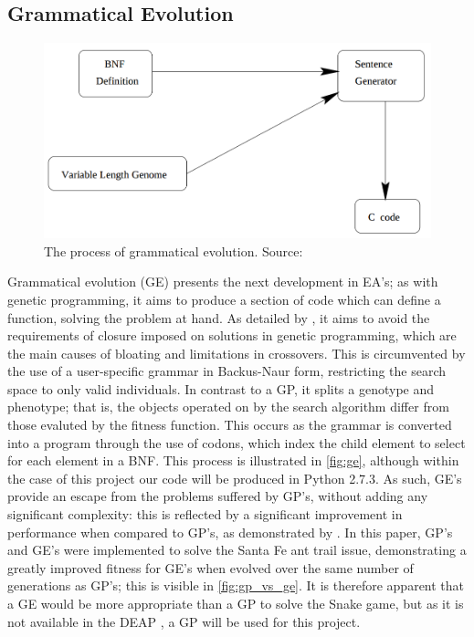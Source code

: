 \documentclass[british,10pt,a4paper]{article}
\begin{document}
\subsection{Grammatical Evolution}
\begin{figure}
\centering
	\includegraphics[width=12cm,keepaspectratio]{images/ge.png}
	\caption{The process of grammatical evolution. Source: \cite{ryan:1998:geepal}}
	\label{fig:ge}
\end{figure}
Grammatical evolution (GE) presents the next development in EA's; as with genetic programming, it aims to produce a section of code which can define a function, solving the problem at hand. As detailed by \citet{ryan:1998:geepal}, it aims to avoid the requirements of closure imposed on solutions in genetic programming, which are the main causes of bloating and limitations in crossovers. This is circumvented by the use of a user-specific grammar in Backus-Naur form, restricting the search space to only valid individuals. In contrast to a GP, it splits a genotype and phenotype; that is, the objects operated on by the search algorithm differ from those evaluted by the fitness function. This occurs as the grammar is converted into a program through the use of codons, which index the child element to select for each element in a BNF. This process is illustrated in \autoref{fig:ge}, although within the case of this project our code will be produced in Python 2.7.3. As such, GE's provide an escape from the problems suffered by GP's, without adding any significant complexity: this is reflected by a significant improvement in performance when compared to GP's, as demonstrated by \citet{Michael_ONeill1999-zi}. In this paper, GP's and GE's were implemented to solve the Santa Fe ant trail issue, demonstrating a greatly improved fitness for GE's when evolved over the same number of generations as GP's; this is visible in \autoref{fig:gp_vs_ge}. It is therefore apparent that a GE would be more appropriate than a GP to solve the Snake game, but as it is not available in the DEAP \cite{deap}, a GP will be used for this project.
\end{document}
